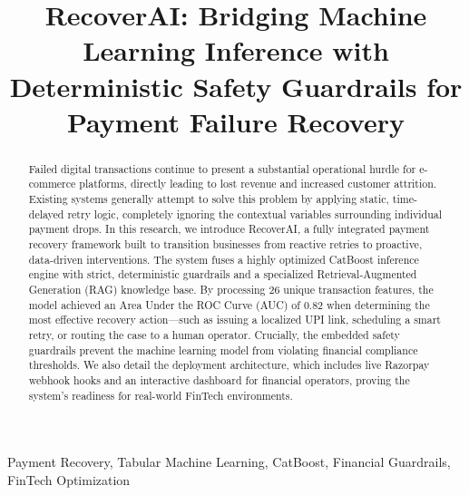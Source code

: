 \documentclass[conference]{IEEEtran}
\begin{document}
\title{RecoverAI: Bridging Machine Learning Inference with Deterministic Safety Guardrails for Payment Failure Recovery}

\author{
\and
{}
}

\maketitle

\begin{abstract}
Failed digital transactions continue to present a substantial operational hurdle for e-commerce platforms, directly leading to lost revenue and increased customer attrition. Existing systems generally attempt to solve this problem by applying static, time-delayed retry logic, completely ignoring the contextual variables surrounding individual payment drops. In this research, we introduce RecoverAI, a fully integrated payment recovery framework built to transition businesses from reactive retries to proactive, data-driven interventions. The system fuses a highly optimized CatBoost inference engine with strict, deterministic guardrails and a specialized Retrieval-Augmented Generation (RAG) knowledge base. By processing 26 unique transaction features, the model achieved an Area Under the ROC Curve (AUC) of 0.82 when determining the most effective recovery action—such as issuing a localized UPI link, scheduling a smart retry, or routing the case to a human operator. Crucially, the embedded safety guardrails prevent the machine learning model from violating financial compliance thresholds. We also detail the deployment architecture, which includes live Razorpay webhook hooks and an interactive dashboard for financial operators, proving the system's readiness for real-world FinTech environments.
\end{abstract}

\begin{IEEEkeywords}
Payment Recovery, Tabular Machine Learning, CatBoost, Financial Guardrails, FinTech Optimization
\end{IEEEkeywords}
\end{document}
